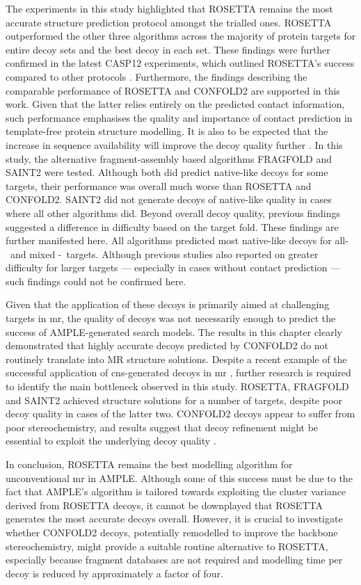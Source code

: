 The experiments in this study highlighted that ROSETTA remains the most accurate structure prediction protocol amongst the trialled ones. ROSETTA outperformed the other three algorithms across the majority of protein targets for entire decoy sets and the best decoy in each set. These findings were further confirmed in the latest CASP12 experiments, which outlined ROSETTA's success compared to other protocols \cite{Ovchinnikov2018-wp,Abriata2018-lu}. Furthermore, the findings describing the comparable performance of ROSETTA and CONFOLD2 \cite{Adhikari2018-lj,Michel2017-xh} are supported in this work. Given that the latter relies entirely on the predicted contact information, such performance emphasises the quality and importance of contact prediction in template-free protein structure modelling. It is also to be expected that the increase in sequence availability will improve the decoy quality further \cite{Abriata2018-lu,Schaarschmidt2018-mh}.  
In this study, the alternative fragment-assembly based algorithms FRAGFOLD and SAINT2 were tested. Although both did predict native-like decoys for some targets, their performance was overall much worse than ROSETTA and CONFOLD2. SAINT2 did not generate decoys of native-like quality in cases where all other algorithms did. Beyond overall decoy quality, previous findings suggested a difference in difficulty based on the target fold. These findings are further manifested here. All algorithms predicted most native-like decoys for all-\textalpha\ and mixed \textalpha-\textbeta\ targets. Although previous studies also reported on greater difficulty for larger targets --- especially in cases without contact prediction --- such findings could not be confirmed here.

Given that the application of these decoys is primarily aimed at challenging targets in \gls{mr}, the quality of decoys was not necessarily enough to predict the success of AMPLE-generated search models. The results in this chapter clearly demonstrated that highly accurate decoys predicted by CONFOLD2 do not routinely translate into MR structure solutions. Despite a recent example of the successful application of \gls{cns}-generated decoys in \gls{mr} \cite{Sjodt2018-zq}, further research is required to identify the main bottleneck observed in this study. ROSETTA, FRAGFOLD and SAINT2 achieved structure solutions for a number of targets, despite poor decoy quality in cases of the latter two. CONFOLD2 decoys appear to suffer from poor stereochemistry, and results suggest that decoy refinement might be essential to exploit the underlying decoy quality \cite{Mao2014-lg}.

In conclusion, ROSETTA remains the best modelling algorithm for unconventional \gls{mr} in AMPLE. Although some of this success must be due to the fact that AMPLE's algorithm is tailored towards exploiting the cluster variance derived from ROSETTA decoys, it cannot be downplayed that ROSETTA generates the most accurate decoys overall. However, it is crucial to investigate whether CONFOLD2 decoys, potentially remodelled to improve the backbone stereochemistry, might provide a suitable routine alternative to ROSETTA, especially because fragment databases are not required and modelling time per decoy is reduced by approximately a factor of four.
